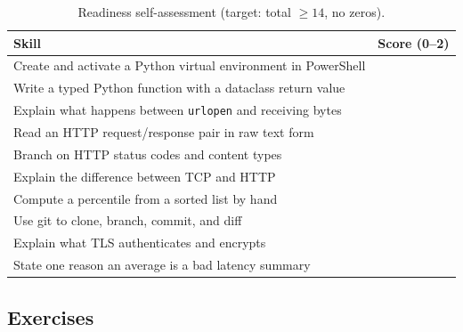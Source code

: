 \begin{table}[h]
  \centering
  \small
  \begin{tabularx}{\textwidth}{X c}
    \toprule
    \textbf{Skill} & \textbf{Score (0--2)} \\
    \midrule
    Create and activate a Python virtual environment in PowerShell & \\
    Write a typed Python function with a dataclass return value & \\
    Explain what happens between \texttt{urlopen} and receiving bytes & \\
    Read an HTTP request/response pair in raw text form & \\
    Branch on HTTP status codes and content types & \\
    Explain the difference between TCP and HTTP & \\
    Compute a percentile from a sorted list by hand & \\
    Use git to clone, branch, commit, and diff & \\
    Explain what TLS authenticates and encrypts & \\
    State one reason an average is a bad latency summary & \\
    \bottomrule
  \end{tabularx}
  \caption{Readiness self-assessment (target: total $\geq 14$, no zeros).}
  \label{tab:ch0-readiness}
\end{table}

\subsection{Exercises}


